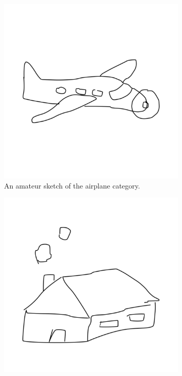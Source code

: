 \begin{figure}
    \centering
    \begin{subfigure}{.3\textwidth}
        \includegraphics[width=\textwidth]{graphics/tuberlin/3.pdf}
        \caption{An amateur sketch of the airplane category.}
    \end{subfigure}
    \begin{subfigure}{.3\textwidth}
        \includegraphics[width=\textwidth]{graphics/tuberlin/8801.pdf}

\end{subfigure}
\end{figure}
